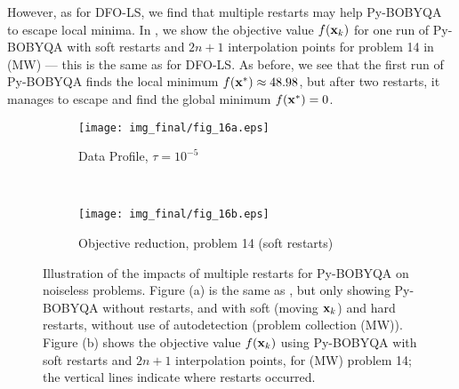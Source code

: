 However, as for DFO-LS, we find that multiple restarts may help Py-BOBYQA to escape local minima.
In , we show the objective value $f(\mathbf{x}_k)$ for one run of Py-BOBYQA with soft restarts and $2n+1$ interpolation points for problem 14 in (MW) --- this is the same as  for DFO-LS.
As before, we see that the first run of Py-BOBYQA finds the local minimum $f(\mathbf{x}^*)\approx 48.98$, but after two restarts, it manages to escape and find the global minimum $f(\mathbf{x}^*)=0$.

\begin{figure}
	\centering
	\begin{subfigure}[b]{0.48\textwidth}
		\texttt{[image: img\_final/fig\_16a.eps]}
		\caption{Data Profile, $\tau=10^{-5}$}
		\label{fig_smooth_restarts_pybobyqa_profiles}
	\end{subfigure}
	~
	\begin{subfigure}[b]{0.48\textwidth}
		\texttt{[image: img\_final/fig\_16b.eps]}
		\caption{Objective reduction, problem 14 (soft restarts)}
		\label{fig_smooth_restarts_pybobyqa_prob14}
	\end{subfigure}
	\caption{Illustration of the impacts of multiple restarts for Py-BOBYQA on noiseless problems. Figure (a) is the same as , but only showing Py-BOBYQA without restarts, and with soft (moving $\mathbf{x}_k$) and hard restarts, without use of autodetection (problem collection (MW)). Figure (b) shows the objective value $f(\mathbf{x}_k)$ using Py-BOBYQA with soft restarts and $2n+1$ interpolation points, for (MW) problem 14; the vertical lines indicate where restarts occurred.}
	\label{fig_smooth_restarts_pybobyqa}
\end{figure}

